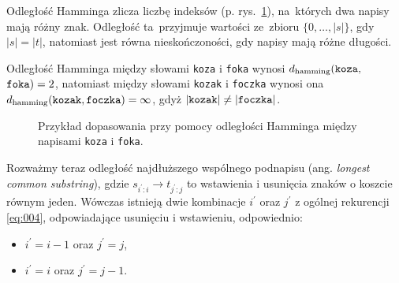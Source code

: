\documentclass{praca1}
\begin{document}
Odległość Hamminga zlicza liczbę indeksów (p. rys.~\ref{rys:002}), na~których dwa napisy mają różny znak. Odległość ta~przyjmuje wartości ze~zbioru $\{0,\ldots,|s|\}$, gdy $|s|=|t|$, natomiast jest równa nieskończoności, gdy napisy mają różne długości.

\begin{example}
Odległość Hamminga między słowami \verb|koza| i \verb|foka| wynosi $d_{\mathrm{hamming}}(\verb|koza|,$ $\verb|foka|) = 2$, natomiast między słowami \verb|kozak| i \verb|foczka| wynosi ona $d_{\mathrm{hamming}}(\verb|kozak|, \verb|foczka|) = \infty$, gdyż $|\verb|kozak| | \neq | \verb|foczka| |$.
\end{example}

\begin{figure}[width=80pt]
\centering
{}
\cprotect\caption{Przykład dopasowania przy pomocy odległości Hamminga między napisami \verb|koza| i \verb|foka|.}\label{rys:002}
\end{figure}



Rozważmy teraz odległość najdłuższego wspólnego podnapisu (ang. \emph{longest common substring}), gdzie $s_{i^\prime:i}\rightarrow t_{j^\prime:j}$ to wstawienia i usunięcia znaków o koszcie równym jeden. Wówczas istnieją dwie kombinacje $i^\prime$ oraz $j^\prime$ z ogólnej rekurencji \ref{eq:004}, odpowiadające usunięciu i wstawieniu, odpowiednio:
\begin{itemize}
\item $i^\prime = i - 1$ oraz $j^\prime = j$,
\item $i^\prime = i$ oraz $j^\prime = j - 1$.
\end{itemize}
\end{document}
